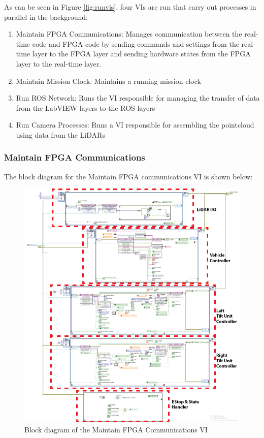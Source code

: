 \noindent As can be seen in Figure \ref{fig:runvis}, four VIs are run that carry out processes in parallel in the background:

\begin{enumerate}
\item Maintain FPGA Communications: Manages communication between the real-time code and FPGA code by sending commands and settings from the real-time layer to the FPGA layer and sending hardware states from the FPGA layer to the real-time layer. 
\item Maintain Mission Clock: Maintains a running mission clock
\item Run ROS Network: Runs the VI responsible for managing the transfer of data from the LabVIEW layers to the ROS layers
\item Run Camera Processes: Runs a VI responsible for assembling the pointcloud using data from the LiDARs
\end{enumerate}

\newpage

\subsubsection{Maintain FPGA Communications}

The block diagram for the Maintain FPGA communications VI is shown below:

\begin{figure}[h!]
\centering
\includegraphics[scale=0.55]{Photos/MaintainFPGAComms_annotated.png}
\caption{Block diagram of the Maintain FPGA Communications VI}
\label{fig:maintainfpgacomms}
\end{figure}

